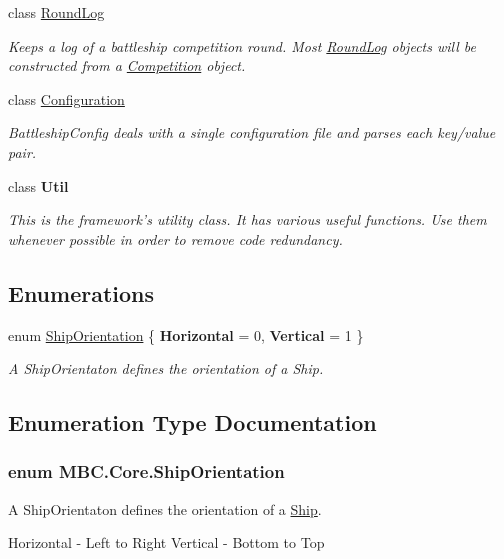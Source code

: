 \begin{DoxyCompactItemize}
class \hyperlink{class_m_b_c_1_1_core_1_1_round_log}{Round\-Log}
\begin{DoxyCompactList}\small\item\em Keeps a log of a battleship competition round. Most \hyperlink{class_m_b_c_1_1_core_1_1_round_log}{Round\-Log} objects will be constructed from a \hyperlink{class_m_b_c_1_1_core_1_1_competition}{Competition} object. \end{DoxyCompactList}\item 
class \hyperlink{class_m_b_c_1_1_core_1_1_configuration}{Configuration}
\begin{DoxyCompactList}\small\item\em Battleship\-Config deals with a single configuration file and parses each key/value pair. \end{DoxyCompactList}\item 
class {\bfseries Util}
\begin{DoxyCompactList}\small\item\em This is the framework's utility class. It has various useful functions. Use them whenever possible in order to remove code redundancy.\end{DoxyCompactList}\end{DoxyCompactItemize}
\subsection*{Enumerations}
\begin{DoxyCompactItemize}
\item 
enum \hyperlink{namespace_m_b_c_1_1_core_ae989f577ccd976664aa442c2cda4d12f}{Ship\-Orientation} \{ {\bfseries Horizontal} = 0, 
{\bfseries Vertical} = 1
 \}
\begin{DoxyCompactList}\small\item\em A Ship\-Orientaton defines the orientation of a Ship. \end{DoxyCompactList}\end{DoxyCompactItemize}


\subsection{Enumeration Type Documentation}
\hypertarget{namespace_m_b_c_1_1_core_ae989f577ccd976664aa442c2cda4d12f}{
\subsubsection[{Ship\-Orientation}]{\setlength{\rightskip}{0pt plus 5cm}enum {\bf M\-B\-C.\-Core.\-Ship\-Orientation}}}\label{namespace_m_b_c_1_1_core_ae989f577ccd976664aa442c2cda4d12f}


A Ship\-Orientaton defines the orientation of a \hyperlink{class_m_b_c_1_1_core_1_1_ship}{Ship}. 

Horizontal -\/ Left to Right Vertical -\/ Bottom to Top 